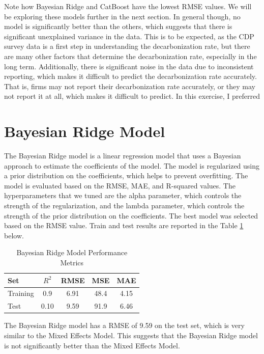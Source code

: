

\noindent Note how Bayesian Ridge and CatBoost have the lowest RMSE values. We will be exploring these models further in the next section. In general though, no model is significantly better than the others, which suggests that there is significant unexplained variance in the data. This is to be expected, as the CDP survey data is a first step in understanding the decarbonization rate, but there are many other factors that determine the decarbonization rate, especially in the long term. Additionally, there is significant noise in the data due to inconsistent reporting, which makes it difficult to predict the decarbonization rate accurately. That is, firms may not report their decarbonization rate accurately, or they may not report it at all, which makes it difficult to predict. In this exercise, I preferred

\section{Bayesian Ridge Model}

The Bayesian Ridge model is a linear regression model that uses a Bayesian approach to estimate the coefficients of the model. The model is regularized using a prior distribution on the coefficients, which helps to prevent overfitting. The model is evaluated based on the RMSE, MAE, and R-squared values. The hyperparameters that we tuned are the alpha parameter, which controls the strength of the regularization, and the lambda parameter, which controls the strength of the prior distribution on the coefficients. The best model was selected based on the RMSE value. Train and test results are reported in the Table \ref{tab:bayesian_ridge_performance} below. 

\begin{table}[H]
    \centering
    \caption{Bayesian Ridge Model Performance Metrics}
    \label{tab:bayesian_ridge_performance}
    \begin{tabular}{lcccc}
    \hline
    Set & $R^2$ & RMSE & MSE & MAE \\ 
    \hline
    Training & 0.9 & 6.91 & 48.4 & 4.15 \\
    Test & 0.10 & 9.59 & 91.9 & 6.46 \\
    \hline
    \end{tabular}
\end{table}
\noindent The Bayesian Ridge model has a RMSE of 9.59 on the test set, which is very similar to the Mixed Effects Model. This suggests that the Bayesian Ridge model is not significantly better than the Mixed Effects Model. 

